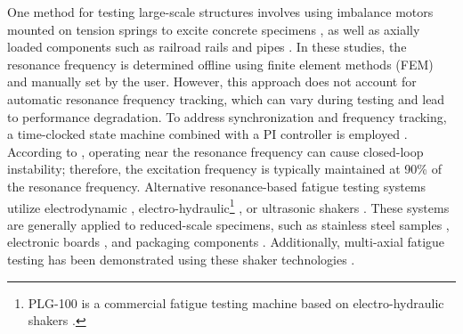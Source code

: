 \documentclass[lettersize,journal]{IEEEtran}
\begin{document}
One method for testing large-scale structures involves using imbalance motors mounted on tension springs to excite concrete specimens \cite{SCHRAMM2024117045}, as well as axially loaded components such as railroad rails \cite{SCHNEIDER2018171,herrmann2018simulation_Thesis} and pipes \cite{Santus_2024}. In these studies, the resonance frequency is determined offline using finite element methods (FEM) and manually set by the user. However, this approach does not account for automatic resonance frequency tracking, which can vary during testing and lead to performance degradation. To address synchronization and frequency tracking, a time-clocked state machine combined with a PI controller is employed \cite{SCHRAMM2024117045,SCHNEIDER2018171,herrmann2018simulation_Thesis}. According to \cite{SCHNEIDER2018171}, operating near the resonance frequency can cause closed-loop instability; therefore, the excitation frequency is typically maintained at 90\% of the resonance frequency. Alternative resonance-based fatigue testing systems utilize electrodynamic \cite{Su2014,George_2006,CESNIK20125370,gautrelet2020resonance,DORANGA2024115368,Rouillard_2000}, electro-hydraulic\footnote{PLG-100 is a commercial fatigue testing machine based on electro-hydraulic shakers \cite{met11101512}.} \cite{Ji_2010,Rouillard_2000}, or ultrasonic shakers \cite{Stanzl01041980_fast_ultrasonic}. These systems are generally applied to reduced-scale specimens, such as stainless steel samples \cite{Gautrelet_2020}, electronic boards \cite{Su2014,feng2003development_Japaneese}, and packaging components \cite{Rouillard_2000}. Additionally, multi-axial fatigue testing has been demonstrated using these shaker technologies \cite{George_2006,Dupke2026}.
\end{document}
